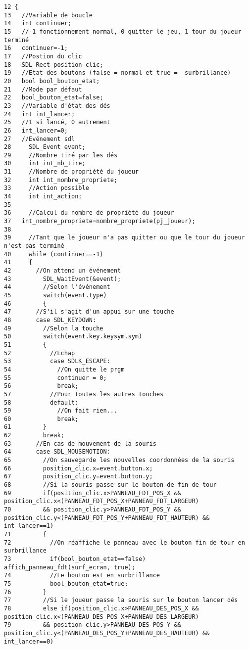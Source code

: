 \begin{Code}\begin{verbatim}12 {
13   //Variable de boucle
14   int continuer;
15   //-1 fonctionnement normal, 0 quitter le jeu, 1 tour du joueur terminé
16   continuer=-1;
17   //Postion du clic
18   SDL_Rect position_clic;
19   //Etat des boutons (false = normal et true =  surbrillance)
20   bool bool_bouton_etat;
21   //Mode par défaut
22   bool_bouton_etat=false;
23   //Variable d'état des dés
24   int int_lancer;
25   //1 si lancé, 0 autrement
26   int_lancer=0;
27   //Evénement sdl
28     SDL_Event event;
29     //Nombre tiré par les dés
30     int int_nb_tire;
31     //Nombre de propriété du joueur
32     int int_nombre_propriete;
33     //Action possible
34     int int_action;
35     
36     //Calcul du nombre de propriété du joueur
37   int_nombre_propriete=nombre_propriete(pj_joueur);
38   
39     //Tant que le joueur n'a pas quitter ou que le tour du joueur n'est pas terminé
40     while (continuer==-1)
41     {
42       //On attend un événement
43         SDL_WaitEvent(&event);
44         //Selon l'événement
45         switch(event.type)
46         {
47       //S'il s'agit d'un appui sur une touche
48       case SDL_KEYDOWN:
49         //Selon la touche
50         switch(event.key.keysym.sym)
51         {
52           //Echap
53           case SDLK_ESCAPE:
54             //On quitte le prgm
55             continuer = 0;
56             break;
57           //Pour toutes les autres touches
58           default:
59             //On fait rien...
60             break;
61         }
62         break;
63       //En cas de mouvement de la souris
64       case SDL_MOUSEMOTION:
65         //On sauvegarde les nouvelles coordonnées de la souris
66         position_clic.x=event.button.x;
67         position_clic.y=event.button.y;
68         //Si la souris passe sur le bouton de fin de tour
69         if(position_clic.x>PANNEAU_FDT_POS_X && position_clic.x<(PANNEAU_FDT_POS_X+PANNEAU_FDT_LARGEUR)
70         && position_clic.y>PANNEAU_FDT_POS_Y && position_clic.y<(PANNEAU_FDT_POS_Y+PANNEAU_FDT_HAUTEUR) && int_lancer==1)
71         {
72           //On réaffiche le panneau avec le bouton fin de tour en surbrillance
73           if(bool_bouton_etat==false) affich_panneau_fdt(surf_ecran, true);
74           //Le bouton est en surbrillance
75           bool_bouton_etat=true;
76         }
77         //Si le joueur passe la souris sur le bouton lancer dés
78         else if(position_clic.x>PANNEAU_DES_POS_X && position_clic.x<(PANNEAU_DES_POS_X+PANNEAU_DES_LARGEUR)
79         && position_clic.y>PANNEAU_DES_POS_Y && position_clic.y<(PANNEAU_DES_POS_Y+PANNEAU_DES_HAUTEUR) && int_lancer==0)

\end{verbatim}
\end{Code}
